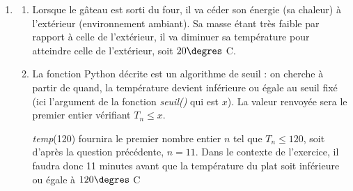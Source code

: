 \begin{enumerate}
\begin{enumerate}
	De plus  $\forall n\in \N$, $u_n=T_n-20$ donc $T_n=u_n+20=160\times 0,955^n+20$.
		\item $\displaystyle\lim\limits_{n \rightarrow +\infty} 0,955^n=0$ car $0,955\in ]-1~;~1[$. Donc $\displaystyle\lim\limits_{n \rightarrow +\infty} T_n=20$.
		\item $T_n\leqslant 120 \iff 160\times 0,955^n+20\leqslant 120 \iff 160\times 0,955^n \leqslant 120-20 \iff 160\times 0,955^n \leqslant 100 \\
		\iff 0,955^n \leqslant \dfrac{100}{160} \iff 0,955^n \leqslant \dfrac58$.

		Sachant que la fonction $f:x\mapsto \ln(x)$ est strictement croissante sur $]0~;~+\infty[$, on obtient :

$\ln\left(0,955^n\right)\leqslant \ln\left(\dfrac58\right) \iff  n \times \ln(0,955) \leqslant \ln\left(\dfrac58\right)$. Or $\ln(0,955)<0$ donc,

$n\geqslant \dfrac{\ln\left(\dfrac58\right)}{\ln(0,955)}$. À la calculatrice, $\dfrac{\ln\left(\dfrac58\right)}{\ln(0,955)} \approx 10,21$ donc $n\geqslant 11$.
	\end{enumerate}
\item 
\begin{enumerate}
	\item Lorsque le gâteau est sorti du four, il va céder son énergie (sa chaleur) à l'extérieur (environnement ambiant). Sa masse étant très faible par rapport à celle de l'extérieur, il va diminuer sa température pour atteindre celle de l'extérieur, soit $20 \degres$ C.
	\item La fonction Python décrite est un algorithme de seuil : on cherche à partir de quand, la température devient inférieure ou égale au seuil fixé (ici l'argument de la fonction \textit{seuil()} qui est $x$). La valeur renvoyée sera le premier entier vérifiant $T_n\leqslant x$.

\textit{temp}(120) fournira le premier nombre entier $n$ tel que $T_n\leqslant 120$, soit d'après la question précédente, $n=11$. Dans le contexte de l'exercice, il faudra donc 11 minutes avant que la température du plat soit inférieure ou égale à $120 \degres$ C
\end{enumerate}
\end{enumerate}
\pagebreak

